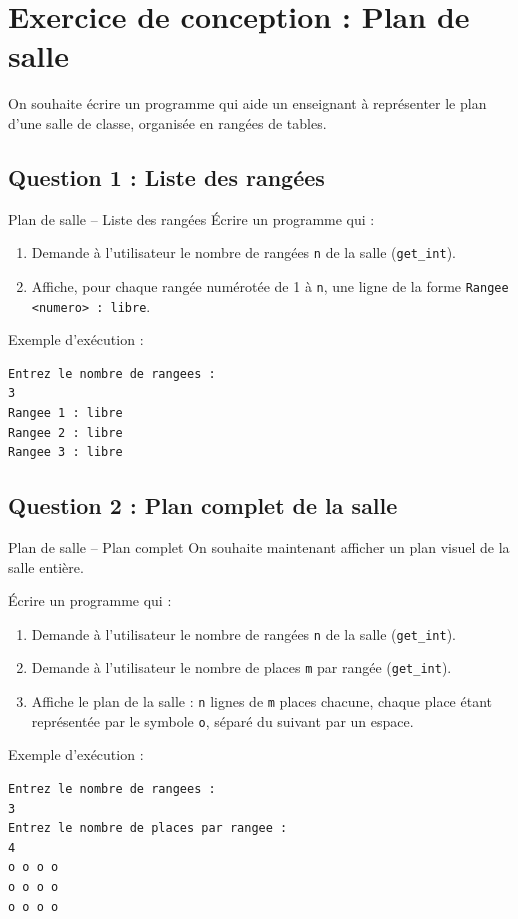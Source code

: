 \section{Exercice de conception : Plan de salle}
On souhaite écrire un programme qui aide un enseignant à représenter le plan d'une salle de classe, organisée en rangées de tables.

\subsection{Question 1 : Liste des rangées}

\begin{UPSTIManipulation}{Plan de salle -- Liste des rangées}
	Écrire un programme qui :
	\begin{enumerate}
		\item Demande à l'utilisateur le nombre de rangées \texttt{n} de la salle (\texttt{get\_int}).
		\item Affiche, pour chaque rangée numérotée de 1 à \texttt{n}, une ligne de la forme \texttt{Rangee <numero> : libre}.
	\end{enumerate}

	Exemple d'exécution :
	\begin{lstlisting}[language=bash,style=console]
Entrez le nombre de rangees :
3
Rangee 1 : libre
Rangee 2 : libre
Rangee 3 : libre
\end{lstlisting}
\end{UPSTIManipulation}

\subsection{Question 2 : Plan complet de la salle}

\begin{UPSTIManipulation}{Plan de salle -- Plan complet}
	On souhaite maintenant afficher un plan visuel de la salle entière.

	Écrire un programme qui :
	\begin{enumerate}
		\item Demande à l'utilisateur le nombre de rangées \texttt{n} de la salle (\texttt{get\_int}).
		\item Demande à l'utilisateur le nombre de places \texttt{m} par rangée (\texttt{get\_int}).
		\item Affiche le plan de la salle : \texttt{n} lignes de \texttt{m} places chacune, chaque place étant représentée par le symbole \texttt{o}, séparé du suivant par un espace.
	\end{enumerate}

	Exemple d'exécution :
	\begin{lstlisting}[language=bash,style=console]
Entrez le nombre de rangees :
3
Entrez le nombre de places par rangee :
4
o o o o
o o o o
o o o o
\end{lstlisting}
\end{UPSTIManipulation}

